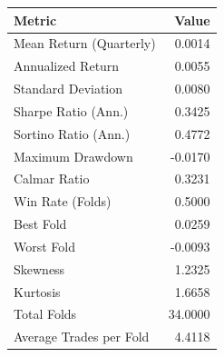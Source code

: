 \begin{tabular}{lr}
\toprule
Metric & Value \\
\midrule
Mean Return (Quarterly) & 0.0014 \\
Annualized Return & 0.0055 \\
Standard Deviation & 0.0080 \\
Sharpe Ratio (Ann.) & 0.3425 \\
Sortino Ratio (Ann.) & 0.4772 \\
Maximum Drawdown & -0.0170 \\
Calmar Ratio & 0.3231 \\
Win Rate (Folds) & 0.5000 \\
Best Fold & 0.0259 \\
Worst Fold & -0.0093 \\
Skewness & 1.2325 \\
Kurtosis & 1.6658 \\
Total Folds & 34.0000 \\
Average Trades per Fold & 4.4118 \\
\bottomrule
\end{tabular}
